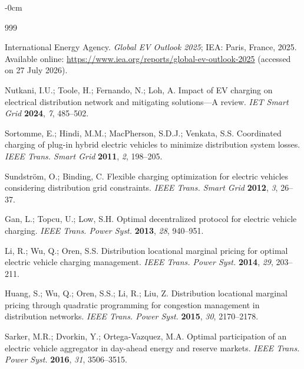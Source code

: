\documentclass[sustainability,article,submit,moreauthors,pdftex]{Definitions/mdpi}
\begin{document}

\FloatBarrier

\vspace{6pt}

\begin{adjustwidth}{-\extralength}{0cm}


\begin{thebibliography}{999}

International Energy Agency.
\textit{Global EV Outlook 2025}; IEA: Paris, France, 2025.
Available online: \url{https://www.iea.org/reports/global-ev-outlook-2025}
(accessed on 27 July 2026).

Nutkani, I.U.; Toole, H.; Fernando, N.; Loh, A.
Impact of EV charging on electrical distribution network and mitigating
solutions---A review.
\textit{IET Smart Grid} \textbf{2024}, \textit{7}, 485--502.

Sortomme, E.; Hindi, M.M.; MacPherson, S.D.J.; Venkata, S.S.
Coordinated charging of plug-in hybrid electric vehicles to minimize
distribution system losses.
\textit{IEEE Trans. Smart Grid} \textbf{2011}, \textit{2}, 198--205.

Sundstr\"om, O.; Binding, C.
Flexible charging optimization for electric vehicles considering
distribution grid constraints.
\textit{IEEE Trans. Smart Grid} \textbf{2012}, \textit{3}, 26--37.

Gan, L.; Topcu, U.; Low, S.H.
Optimal decentralized protocol for electric vehicle charging.
\textit{IEEE Trans. Power Syst.} \textbf{2013}, \textit{28}, 940--951.

Li, R.; Wu, Q.; Oren, S.S.
Distribution locational marginal pricing for optimal electric vehicle
charging management.
\textit{IEEE Trans. Power Syst.} \textbf{2014}, \textit{29}, 203--211.

Huang, S.; Wu, Q.; Oren, S.S.; Li, R.; Liu, Z.
Distribution locational marginal pricing through quadratic programming
for congestion management in distribution networks.
\textit{IEEE Trans. Power Syst.} \textbf{2015}, \textit{30}, 2170--2178.

Sarker, M.R.; Dvorkin, Y.; Ortega-Vazquez, M.A.
Optimal participation of an electric vehicle aggregator in day-ahead
energy and reserve markets.
\textit{IEEE Trans. Power Syst.} \textbf{2016}, \textit{31}, 3506--3515.


\end{thebibliography}
\end{adjustwidth}
\end{document}
